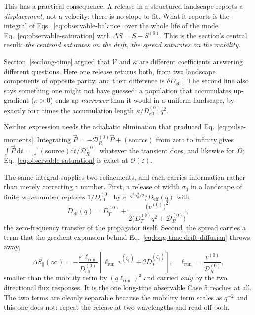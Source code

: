 \documentclass[
  reprint,
  superscriptaddress,
  amsmath,
  amssymb,
  aps,
  pre,
  nofootinbib,
  floatfix
]{revtex4-2}
\newcommand{\dd}{\mathrm d}
\newcommand{\ord}{\mathcal O}
\newcommand{\DR}{\mathcal D_R^{(0)}}
\newcommand{\zp}{\zeta_\parallel}
\newcommand{\Pnet}{\vec P}
\begin{document}
This has a practical consequence.  A release in a structured landscape reports
a \emph{displacement}, not a velocity: there is no slope to fit.  What it
reports is the integral of Eqs.~\eqref{eq:observable-balance} over the whole
life of the mode,
Eq.~\eqref{eq:observable-saturation}
with $\Delta S=S-S^{(0)}$.  This is the section's central result:
\emph{the centroid saturates on the drift, the spread saturates on the
mobility}.

Section~\ref{sec:long-time} argued that $\mathcal V$ and
$\kappa$ are different coefficients answering different questions.  Here one
release returns both, from two landscape components of opposite parity, and
their difference is $\delta D_{\mathrm{eff}}'$.  The second line also says
something one might not have guessed: a population that accumulates
up-gradient ($\kappa>0$) ends up \emph{narrower} than it would in a uniform
landscape, by exactly four times the accumulation length
$\kappa/D_{\mathrm{eff}}^{(0)}q^{2}$.

Neither expression needs the adiabatic elimination that produced
Eq.~\eqref{eq:pulse-moments}.  Integrating
$\dot\Pnet=-\DR\Pnet+(\text{source})$ from zero to infinity gives
$\int\Pnet\,\dd t=\int(\text{source})\dd t/\DR$ whatever the transient does,
and likewise for $\Omega$; Eq.~\eqref{eq:observable-saturation} is exact at
$\ord(\varepsilon)$.

The same integral supplies two refinements, and each carries information
rather than merely correcting a number.  First, a release of width $\sigma_0$
in a landscape of finite wavenumber replaces $1/D_{\mathrm{eff}}^{(0)}$ by
$e^{-q^{2}\sigma_0^{2}/2}/D_{\mathrm{eff}}(q)$ with
\begin{equation}
 D_{\mathrm{eff}}(q)=D_T^{(0)}
 +\frac{\bigl(v^{(0)}\bigr)^{2}}{2\bigl(D_T^{(0)}q^{2}+\DR\bigr)},
 \label{eq:mode-effective-diffusivity}
\end{equation}
the zero-frequency transfer of the propagator itself.  Second, the spread
carries a term that the gradient expansion behind
Eq.~\eqref{eq:long-time-drift-diffusion} throws away,
\begin{equation}
 \Delta S_\parallel(\infty)=-\frac{\varepsilon\,\ell_{\mathrm{run}}}{D_{\mathrm{eff}}^{(0)}}
 \left[\ell_{\mathrm{run}}\,v^{(\zp)}+2D_T^{(\zp)}\right],
 \quad \ell_{\mathrm{run}}=\frac{v^{(0)}}{\DR},
 \label{eq:observable-run-correction}
\end{equation}
smaller than the mobility term by $(q\ell_{\mathrm{run}})^{2}$ and carried \emph{only} by
the two directional flux responses.  It is the one long-time observable Case 5
reaches at all.  The two terms are cleanly separable because the mobility term
scales as $q^{-2}$ and this one does not: repeat the release at two
wavelengths and read off both.
\end{document}
